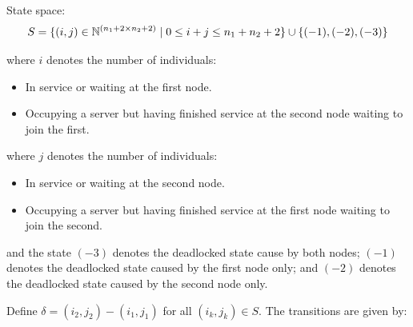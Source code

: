\documentclass{article}
\begin{document}
State space:
    \[S = \{(i,j)\in\mathbb{N}^{(n_1+2\times n_2+2)} \nonscript\; | \nonscript\; 0 \leq i + j \leq n_1 + n_2 + 2
    \}\cup\{(-1), (-2), (-3)\}\]

    where \(i\) denotes the number of individuals:
        \begin{itemize}
            \item In service or waiting at the first node.
            \item Occupying a server but having finished service at the
                second node waiting to join the first.
        \end{itemize}
    where \(j\) denotes the number of individuals:
        \begin{itemize}
            \item In service or waiting at the second node.
            \item Occupying a server but having finished service at the
                first node waiting to join the second.
        \end{itemize}
    and the state $(-3)$ denotes the deadlocked state cause by both nodes; $(-1)$ denotes the deadlocked state caused by the first node only; and $(-2)$ denotes the deadlocked state caused by the second node only.

Define $\delta = (i_2, j_2) - (i_1, j_1)$ for all $(i_k, j_k) \in S$. The transitions are given by:
\end{document}
